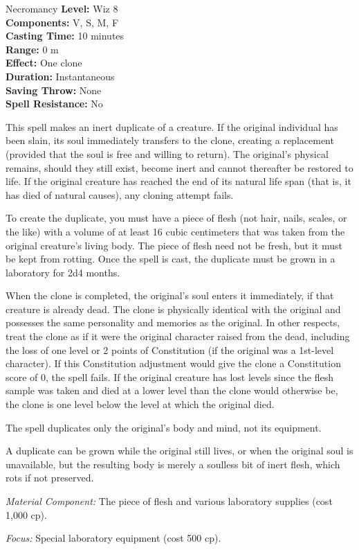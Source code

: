 {Necromancy}
{
	\textbf{Level:}
	Wiz 8\\
	\textbf{Components:}
	V, S, M, F\\
	\textbf{Casting Time:}
	10 minutes\\
	\textbf{Range:}
	0 m\\
	\textbf{Effect:}
	One clone\\
	\textbf{Duration:}
	Instantaneous\\
	\textbf{Saving Throw:}
	None\\
	\textbf{Spell Resistance:}
	No\\
}
{
	This spell makes an inert duplicate of a creature. If the original individual has been slain, its soul immediately transfers to the clone, creating a replacement (provided that the soul is free and willing to return). The original's physical remains, should they still exist, become inert and cannot thereafter be restored to life. If the original creature has reached the end of its natural life span (that is, it has died of natural causes), any cloning attempt fails.

	To create the duplicate, you must have a piece of flesh (not hair, nails, scales, or the like) with a volume of at least 16 cubic centimeters that was taken from the original creature's living body. The piece of flesh need not be fresh, but it must be kept from rotting. Once the spell is cast, the duplicate must be grown in a laboratory for 2d4 months.

	When the clone is completed, the original's soul enters it immediately, if that creature is already dead. The clone is physically identical with the original and possesses the same personality and memories as the original. In other respects, treat the clone as if it were the original character raised from the dead, including the loss of one level or 2 points of Constitution (if the original was a 1st-level character). If this Constitution adjustment would give the clone a Constitution score of 0, the spell fails. If the original creature has lost levels since the flesh sample was taken and died at a lower level than the clone would otherwise be, the clone is one level below the level at which the original died.

	The spell duplicates only the original's body and mind, not its equipment.

	A duplicate can be grown while the original still lives, or when the original soul is unavailable, but the resulting body is merely a soulless bit of inert flesh, which rots if not preserved.

	\textit{Material Component:}
	The piece of flesh and various laboratory supplies (cost 1,000 cp).

	\textit{Focus:}
	Special laboratory equipment (cost 500 cp).

}
